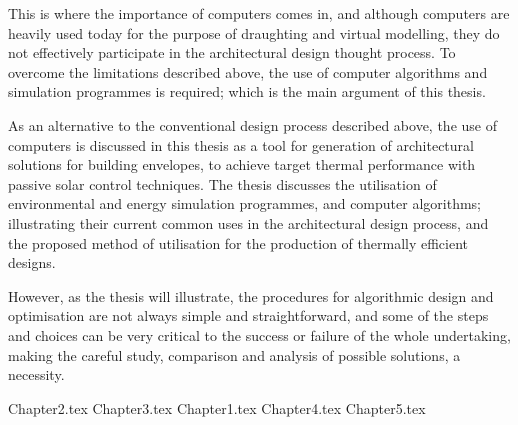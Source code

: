 This is where the importance of computers comes in, and although computers are heavily used today for the purpose of draughting and virtual modelling, they do not effectively participate in the architectural design thought process. To overcome the limitations described above, the use of computer algorithms and simulation programmes is required; which is the main argument of this thesis.

As an alternative to the conventional design process described above, the use of computers is discussed in this thesis as a tool for generation of architectural solutions for building envelopes, to achieve target thermal performance with passive solar control techniques. The thesis discusses the utilisation of environmental and energy simulation programmes, and computer algorithms; illustrating their current common uses in the architectural design process, and the proposed method of utilisation for the production of thermally efficient designs.

However, as the thesis will illustrate, the procedures for algorithmic design and optimisation are not always simple and straightforward, and some of the steps and choices can be very critical to the success or failure of the whole undertaking, making the careful study, comparison and analysis of possible solutions, a necessity.

\mainmatter

{Chapter2.tex}
{Chapter3.tex}
{Chapter1.tex}
{Chapter4.tex}
{Chapter5.tex}

\backmatter



